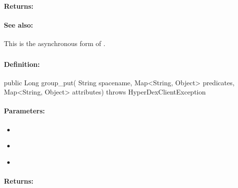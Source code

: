 \paragraph{Returns:}


\paragraph{See also:}  This is the asynchronous form of .

\pagebreak
\subsubsection{}
\label{api:java:group_put}


\paragraph{Definition:}
\begin{javacode}
public Long group_put(
        String spacename,
        Map<String, Object> predicates,
        Map<String, Object> attributes) throws HyperDexClientException
\end{javacode}

\paragraph{Parameters:}
\begin{itemize}[noitemsep]
\item {}\\

\item {}\\

\item {}\\

\end{itemize}

\paragraph{Returns:}


